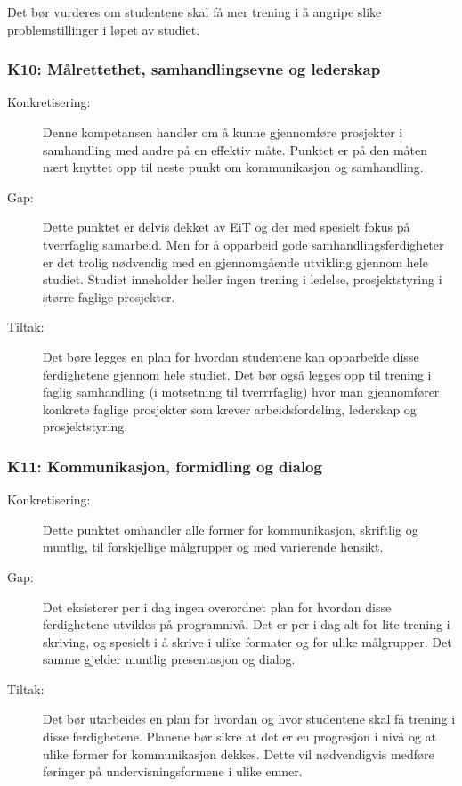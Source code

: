  Det bør vurderes om studentene skal få mer trening i å angripe slike problemstillinger i løpet av studiet.

\subsubsection{K10: Målrettethet, samhandlingsevne og lederskap}
\begin{description}
\item[Konkretisering:] Denne kompetansen handler om å kunne gjennomføre prosjekter i samhandling med andre på en effektiv måte. Punktet er på den måten nært knyttet opp til neste punkt om kommunikasjon og samhandling. 
\item[Gap:]Dette punktet er delvis dekket av EiT og der med spesielt fokus på tverrfaglig samarbeid. Men for å opparbeid gode samhandlingsferdigheter er det trolig nødvendig med en gjennomgående utvikling gjennom hele studiet. Studiet inneholder heller ingen trening i ledelse, prosjektstyring i større faglige prosjekter.
\item[Tiltak:] Det børe legges en plan for hvordan studentene kan opparbeide disse ferdighetene gjennom hele studiet. Det bør også legges opp til trening i faglig samhandling (i  motsetning til tverrrfaglig) hvor man gjennomfører konkrete faglige prosjekter som krever arbeidsfordeling, lederskap og prosjektstyring.
\end{description}

\subsubsection{K11: Kommunikasjon, formidling og dialog}
\begin{description}
\item[Konkretisering:] Dette punktet omhandler alle former for kommunikasjon, skriftlig og muntlig, til forskjellige målgrupper og med varierende hensikt.
\item[Gap:] Det eksisterer per i dag ingen overordnet plan for hvordan disse ferdighetene utvikles på programnivå. Det er per i dag alt for lite trening i skriving, og spesielt i å skrive i ulike formater og for ulike målgrupper. Det samme gjelder muntlig presentasjon og dialog.
\item[Tiltak:] Det bør utarbeides en plan for hvordan og hvor studentene skal få trening i disse ferdighetene. Planene bør sikre at det er en progresjon i nivå og at ulike former for kommunikasjon dekkes. Dette vil nødvendigvis medføre føringer på undervisningsformene i ulike emner.
\end{description}


